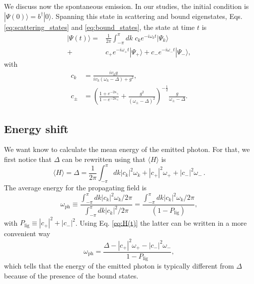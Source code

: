 \documentclass[aps,pra,twocolumn,floatfix,superscriptaddress]{revtex4-1}%
\begin{document}
We discuss now  the spontaneous emission.
In our studies, the  initial condition is $|\Psi(0)\rangle = b^\dagger |0\rangle$. Spanning this state in  scattering and bound eigenstates, Eqs. \eqref{eq:scattering_states} and \eqref{eq:bound_states}, the state at time $t$ is
\begin{align}
|\Psi(t)\rangle = & \frac{1}{2\pi}\int_{-\pi}^\pi dk\;c_ke^{-i\omega_k t}|\Psi_k\rangle \nonumber \\
 + & c_+ e^{-i\omega_+ t} |\Psi_+\rangle + c_- e^{-i\omega_- t} |\Psi_-\rangle, \label{eq:psi(t)}
\end{align}
with
\begin{align} \label{eq:ck}
c_k &  = \frac{iv_k g}{iv_k(\omega_k - \Delta) + g^2},\\
\label{eq:cpm}
c_\pm & =  \left(\frac{1+e^{-2\kappa_\pm}}{1-e^{-2\kappa_\pm}}+\frac{g^2}{(\omega_\pm - \Delta)^2}\right)^{-\frac{1}{2}} \frac{g}{\omega_\pm - \Delta}.
\end{align}

\subsection{Energy shift}

We want know to calculate the mean energy of the emitted photon. For that, we first notice that $\Delta$ can be rewritten using that $\langle H\rangle$ is
\begin{equation}\label{eq:H(t)}
\langle H\rangle = \Delta  = \frac{1}{2\pi}\int_{-\pi}^\pi dk |c_k|^2 \omega_k + |c_+|^2 \omega_+ + |c_-|^2 \omega_- \, .
\end{equation}
The  average energy for the propagating field  is
\begin{equation}
\omega_\text{ph} \equiv \frac{\int_{-\pi}^\pi dk |c_k|^2 \omega_k/2\pi}{\int_{-\pi}^\pi dk |c_k|^2/2\pi} = \frac{\int_{-\pi}^\pi dk |c_k|^2 \omega_k/2\pi}{(1-P_\text{lig})},
\end{equation}
with $P_\text{lig} \equiv |c_+|^2 + |c_-|^2$.  
Using Eq. \eqref{eq:H(t)} the latter can be written in a more convenient way
\begin{equation}
\omega_\text{ph} =\frac{\Delta - |c_+|^2 \omega_+ - |c_-|^2 \omega_-}{1-P_\text{lig}}, \label{eq:omega_ph}
\end{equation}
which tells that the energy of the emitted photon is typically different from $\Delta$ because of the presence of the bound states.
\end{document}
